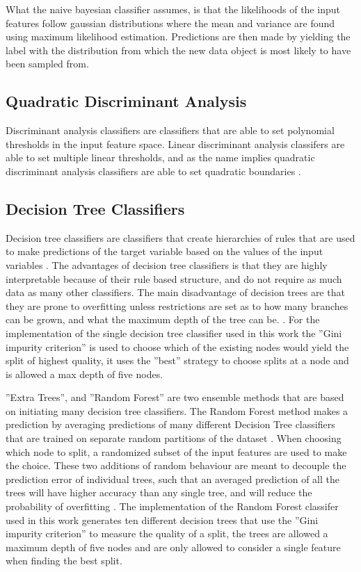 What the naive bayesian classifier assumes, is that the likelihoods of the input features follow gaussian distributions where the mean and variance are found using maximum likelihood estimation. Predictions are then made by yielding the label with the distribution from which the new data object is most likely to have been sampled from.

\subsection{Quadratic Discriminant Analysis}
Discriminant analysis classifiers are classifiers that are able to set polynomial thresholds in the input feature space. Linear discriminant analysis classifers are able to set multiple linear thresholds, and as the name implies quadratic discriminant analysis classifiers are able to set quadratic boundaries \cite{scikit_learn}.

\subsection{Decision Tree Classifiers} \label{meth:dt}

Decision tree classifiers are classifiers that create hierarchies of rules that are used to make predictions of the target variable based on the values of the input variables \cite{python_machine_learning_2nd}. The advantages of decision tree classifiers is that they are highly interpretable because of their rule based structure, and do not require as much data as many other classifiers. The main disadvantage of decision trees are that they are prone to overfitting unless restrictions are set as to how many branches can be grown, and what the maximum depth of the tree can be. \cite{python_machine_learning_2nd}. For the implementation of the single decision tree classifier used in this work the ''Gini impurity criterion'' is used to choose which of the existing nodes would yield the split of highest quality, it uses the ''best'' strategy to choose splits at a node and is allowed a max depth of five nodes. \bigskip

''Extra Trees'', and ''Random Forest'' are two ensemble methods that are based on initiating many decision tree classifiers. The Random Forest method makes a prediction by averaging predictions of many different Decision Tree classifiers that are trained on separate random partitions of the dataset \cite{gen_rand_for}. When choosing which node to split, a randomized subset of the input features are used to make the choice. These two additions of random behaviour are meant to decouple the prediction error of individual trees, such that an averaged prediction of all the trees will have higher accuracy than any single tree, and will reduce the probability of overfitting \cite{scikit_learn}. The implementation of the Random Forest classifer used in this work generates ten different decision trees that use the ''Gini impurity criterion'' to measure the quality of a split, the trees are allowed a maximum depth of five nodes and are only allowed to consider a single feature when finding the best split. \bigskip

